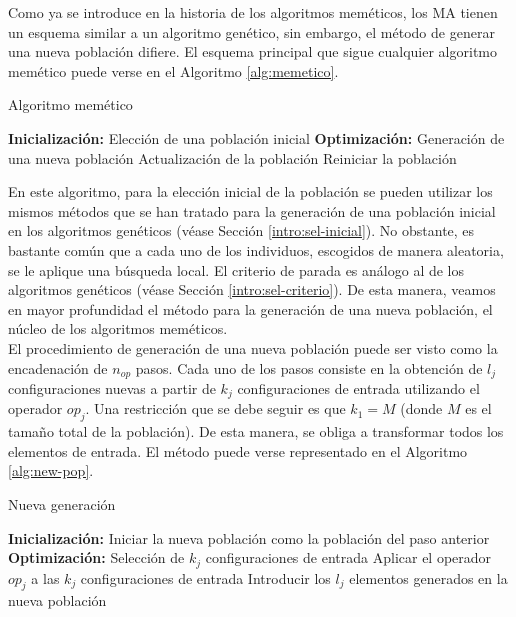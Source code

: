 Como ya se introduce en la historia de los algoritmos meméticos, los MA tienen un esquema similar a un algoritmo genético, sin embargo, el método de generar una nueva población difiere. El esquema principal que sigue cualquier algoritmo memético puede verse en el Algoritmo \ref{alg:memetico}.\\

\begin{algorithm}[!htb]
    \caption{Algoritmo memético}
    \label{alg:memetico}
    \begin{algorithmic}[1]
        \State \textbf{Inicialización:}
        \State Elección de una población inicial
        \State \textbf{Optimización:}
            \State Generación de una nueva población
            \State Actualización de la población
            \State Reiniciar la población
            \EndIf
        \EndWhile
    \end{algorithmic}
\end{algorithm}

En este algoritmo, para la elección inicial de la población se pueden utilizar los mismos métodos que se han tratado para la generación de una población inicial en los algoritmos genéticos (véase Sección \ref{intro:sel-inicial}). No obstante, es bastante común que a cada uno de los individuos, escogidos de manera aleatoria, se le aplique una búsqueda local. El criterio de parada es análogo al de los algoritmos genéticos (véase Sección \ref{intro:sel-criterio}). De esta manera, veamos en mayor profundidad el método para la generación de una nueva población, el núcleo de los algoritmos meméticos.\\

El procedimiento de generación de una nueva población puede ser visto como la encadenación de $n_{op}$ pasos. Cada uno de los pasos consiste en la obtención de $l_j$ configuraciones nuevas a partir de $k_j$ configuraciones de entrada utilizando el operador $op_j$. Una restricción que se debe seguir es que $k_1=M$ (donde $M$ es el tamaño total de la población). De esta manera, se obliga a transformar todos los elementos de entrada. El método puede verse representado en el Algoritmo \ref{alg:new-pop}.\\
\begin{algorithm}[!b]
    \caption{Nueva generación}
    \label{alg:new-pop}
    \begin{algorithmic}[1]
        \State \textbf{Inicialización:}
        \State Iniciar la nueva población como la población del paso anterior
        \State \textbf{Optimización:}
            \State Selección de $k_j$ configuraciones de entrada
            \State Aplicar el operador $op_j$ a las $k_j$ configuraciones de entrada
            \State Introducir los $l_j$ elementos generados en la nueva población
        \EndFor
    \end{algorithmic}
\end{algorithm}

